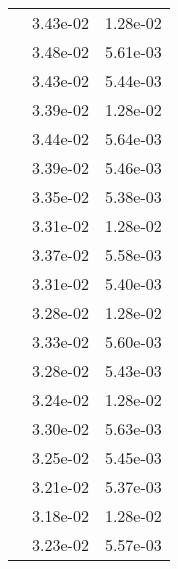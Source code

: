 \begin{table}
\begin{tabular}{c|cc|}
\multicolumn{1}{|c|}{} & \multicolumn{1}{|c|}{  3.43e-02} & \multicolumn{1}{|c|}{  1.28e-02} \\ 
\multicolumn{1}{|c|}{} & \multicolumn{1}{|c|}{  3.48e-02} & \multicolumn{1}{|c|}{  5.61e-03} \\ 
\multicolumn{1}{|c|}{} & \multicolumn{1}{|c|}{  3.43e-02} & \multicolumn{1}{|c|}{  5.44e-03} \\ 
\multicolumn{1}{|c|}{} & \multicolumn{1}{|c|}{  3.39e-02} & \multicolumn{1}{|c|}{  1.28e-02} \\ 
\multicolumn{1}{|c|}{} & \multicolumn{1}{|c|}{  3.44e-02} & \multicolumn{1}{|c|}{  5.64e-03} \\ 
\multicolumn{1}{|c|}{} & \multicolumn{1}{|c|}{  3.39e-02} & \multicolumn{1}{|c|}{  5.46e-03} \\ 
\multicolumn{1}{|c|}{} & \multicolumn{1}{|c|}{  3.35e-02} & \multicolumn{1}{|c|}{  5.38e-03} \\ 
\multicolumn{1}{|c|}{} & \multicolumn{1}{|c|}{  3.31e-02} & \multicolumn{1}{|c|}{  1.28e-02} \\ 
\multicolumn{1}{|c|}{} & \multicolumn{1}{|c|}{  3.37e-02} & \multicolumn{1}{|c|}{  5.58e-03} \\ 
\multicolumn{1}{|c|}{} & \multicolumn{1}{|c|}{  3.31e-02} & \multicolumn{1}{|c|}{  5.40e-03} \\ 
\multicolumn{1}{|c|}{} & \multicolumn{1}{|c|}{  3.28e-02} & \multicolumn{1}{|c|}{  1.28e-02} \\ 
\multicolumn{1}{|c|}{} & \multicolumn{1}{|c|}{  3.33e-02} & \multicolumn{1}{|c|}{  5.60e-03} \\ 
\multicolumn{1}{|c|}{} & \multicolumn{1}{|c|}{  3.28e-02} & \multicolumn{1}{|c|}{  5.43e-03} \\ 
\multicolumn{1}{|c|}{} & \multicolumn{1}{|c|}{  3.24e-02} & \multicolumn{1}{|c|}{  1.28e-02} \\ 
\multicolumn{1}{|c|}{} & \multicolumn{1}{|c|}{  3.30e-02} & \multicolumn{1}{|c|}{  5.63e-03} \\ 
\multicolumn{1}{|c|}{} & \multicolumn{1}{|c|}{  3.25e-02} & \multicolumn{1}{|c|}{  5.45e-03} \\ 
\multicolumn{1}{|c|}{} & \multicolumn{1}{|c|}{  3.21e-02} & \multicolumn{1}{|c|}{  5.37e-03} \\ 
\multicolumn{1}{|c|}{} & \multicolumn{1}{|c|}{  3.18e-02} & \multicolumn{1}{|c|}{  1.28e-02} \\ 
\multicolumn{1}{|c|}{} & \multicolumn{1}{|c|}{  3.23e-02} & \multicolumn{1}{|c|}{  5.57e-03} \\ 

\end{tabular}
\end{table}
